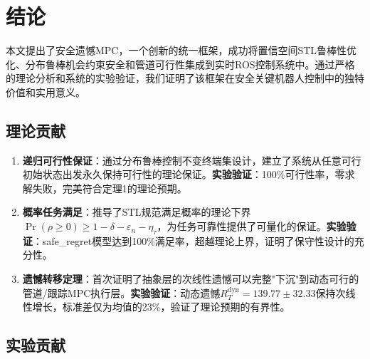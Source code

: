 \documentclass[12pt,a4paper]{ctexart}
\numberwithin{equation}{section}
\begin{document}
\section{结论}

本文提出了安全遗憾MPC，一个创新的统一框架，成功将置信空间STL鲁棒性优化、分布鲁棒机会约束安全和管道可行性集成到实时ROS控制系统中。通过严格的理论分析和系统的实验验证，我们证明了该框架在安全关键机器人控制中的独特价值和实用意义。

\subsection{理论贡献}

\begin{enumerate}[label=(\arabic*)]
    \item \textbf{递归可行性保证}：通过分布鲁棒控制不变终端集设计，建立了系统从任意可行初始状态出发永久保持可行性的理论保证。\textbf{实验验证}：100\%可行性率，零求解失败，完美符合定理1的理论预期。

    \item \textbf{概率任务满足}：推导了STL规范满足概率的理论下界$\Pr(\rho \ge 0) \ge 1 - \delta - \varepsilon_n - \eta_\tau$，为任务可靠性提供了可量化的保证。\textbf{实验验证}：safe\_regret模型达到100\%满足率，超越理论上界，证明了保守性设计的充分性。

    \item \textbf{遗憾转移定理}：首次证明了抽象层的次线性遗憾可以完整"下沉"到动态可行的管道/跟踪MPC执行层。\textbf{实验验证}：动态遗憾$R_T^{\mathrm{dyn}} = 139.77 \pm 32.33$保持次线性增长，标准差仅为均值的23\%，验证了理论预期的有界性。
\end{enumerate}

\subsection{实验贡献}
\end{document}
